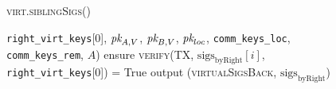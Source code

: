 \begin{figure}[H]
\begin{processbox}{\textsc{virt.siblingSigs}()}
\begin{algorithmic}[1]
      \texttt{right\_virt\_keys}[0], $\textit{pk}_{A, V}$, $\textit{pk}_{B, V}$, $\textit{pk}_{loc}$,
      \texttt{comm\_keys\_loc}, \texttt{comm\_keys\_rem}, $A$)
        \State ensure \textsc{verify}(TX, $\mathrm{sigs}_{\mathrm{byRight}}[i]$,
        \texttt{right\_virt\_keys}[0]) = True
      \EndFor
      \State output (\textsc{virtualSigsBack},
      $\mathrm{sigs}_{\mathrm{byRight}}$) 
    \end{algorithmic}
  \end{processbox}
  \caption{}
  \label{code:virtual-layer:sibling-sigs}
\end{figure}

